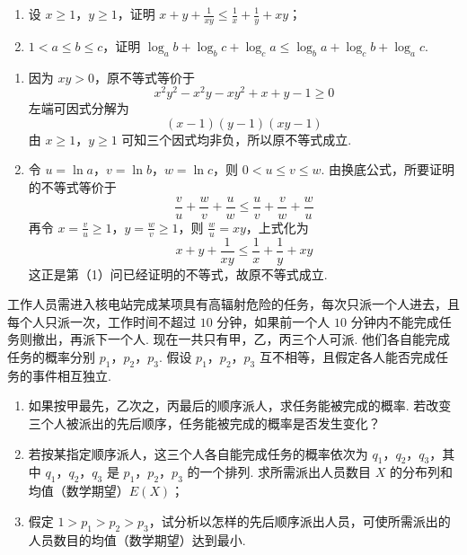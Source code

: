 \begin{problem}
\begin{enumerate}
\item 设 \(x \geqslant 1\)，\(y \geqslant 1\)，证明 \(x + y + \frac{1}{xy} \leqslant \frac{1}{x} + \frac{1}{y} + xy\)；
\item \(1 < a \leqslant b \leqslant c\)，证明 \(\log_{a} b + \log_{b} c + \log_{c} a \leqslant \log_{b} a + \log_{c} b + \log_{a} c\).
\end{enumerate}
\end{problem}

\begin{solution}
\begin{enumerate}
\item 因为 \(xy>0\)，原不等式等价于
\[
x^2y^2-x^2y-xy^2+x+y-1\geqslant0
\]
左端可因式分解为
\[
(x-1)(y-1)(xy-1)
\]
由 \(x\geqslant1\)，\(y\geqslant1\) 可知三个因式均非负，所以原不等式成立.
\item 令 \(u=\ln a\)，\(v=\ln b\)，\(w=\ln c\)，则 \(0<u\leqslant v\leqslant w\). 由换底公式，所要证明的不等式等价于
\[
\frac vu+\frac wv+\frac uw\leqslant\frac uv+\frac vw+\frac wu
\]
再令 \(x=\frac vu\geqslant1\)，\(y=\frac wv\geqslant1\)，则 \(\frac wu=xy\)，上式化为
\[
x+y+\frac1{xy}\leqslant\frac1x+\frac1y+xy
\]
这正是第（1）问已经证明的不等式，故原不等式成立.
\end{enumerate}
\end{solution}

\begin{problem}
工作人员需进入核电站完成某项具有高辐射危险的任务，每次只派一个人进去，且每个人只派一次，工作时间不超过 \(10\) 分钟，如果前一个人 \(10\) 分钟内不能完成任务则撤出，再派下一个人. 现在一共只有甲，乙，丙三个人可派. 他们各自能完成任务的概率分别 \(p_{1}\)，\(p_{2}\)，\(p_{3}\). 假设 \(p_{1}\)，\(p_{2}\)，\(p_{3}\) 互不相等，且假定各人能否完成任务的事件相互独立.

\begin{enumerate}
\item 如果按甲最先，乙次之，丙最后的顺序派人，求任务能被完成的概率. 若改变三个人被派出的先后顺序，任务能被完成的概率是否发生变化？
\item 若按某指定顺序派人，这三个人各自能完成任务的概率依次为 \(q_{1}\)，\(q_{2}\)，\(q_{3}\)，其中 \(q_{1}\)，\(q_{2}\)，\(q_{3}\) 是 \(p_{1}\)，\(p_{2}\)，\(p_{3}\) 的一个排列. 求所需派出人员数目 \(X\) 的分布列和均值（数学期望）\(E(X)\)；
\item 假定 \(1 > p_{1} > p_{2} > p_{3}\)，试分析以怎样的先后顺序派出人员，可使所需派出的人员数目的均值（数学期望）达到最小.
\end{enumerate}
\end{problem}

